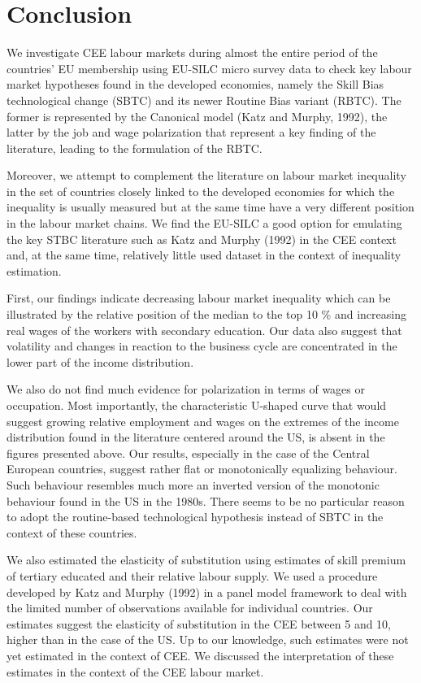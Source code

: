 \documentclass{article}
\begin{document}
\section{Conclusion}
We investigate CEE labour markets during almost the entire period of the countries' EU membership using EU-SILC micro survey data to check key labour market hypotheses found in the developed economies, namely the Skill Bias technological change (SBTC) and its newer Routine Bias variant (RBTC). The former is represented by the Canonical model (Katz and Murphy, 1992), the latter by the job and wage polarization that represent a key finding of the literature, leading to the formulation of the RBTC.

Moreover, we attempt to complement the literature on labour market inequality in the set of countries closely linked to the developed economies for which the inequality is usually measured but at the same time have a very different position in the labour market chains. We find the EU-SILC a good option for emulating the key STBC literature such as Katz and Murphy (1992) in the CEE context and, at the same time, relatively little used dataset in the context of inequality estimation.

First, our findings indicate decreasing labour market inequality which can be illustrated by the relative position of the median to the top 10 \% and increasing real wages of the workers with secondary education. Our data also suggest that volatility and changes in reaction to the business cycle are concentrated in the lower part of the income distribution.

We also do not find much evidence for polarization in terms of wages or occupation. Most importantly, the characteristic U-shaped curve that would suggest growing relative employment and wages on the extremes of the income distribution found in the literature centered around the US, is absent in the figures presented above. Our results, especially in the case of the Central European countries, suggest rather flat or monotonically equalizing behaviour. Such behaviour resembles much more an inverted version of the monotonic behaviour found in the US in the 1980s. There seems to be no particular reason to adopt the routine-based technological hypothesis instead of SBTC in the context of these countries. 

We also estimated the elasticity of substitution using estimates of skill premium of tertiary educated and their relative labour supply. We used a procedure developed by Katz and Murphy (1992) in a panel model framework to deal with the limited number of observations available for individual countries. Our estimates suggest the elasticity of substitution in the CEE between 5 and 10, higher than in the case of the US. Up to our knowledge, such estimates were not yet estimated in the context of CEE. We discussed the interpretation of these estimates in the context of the CEE labour market.
\end{document}
